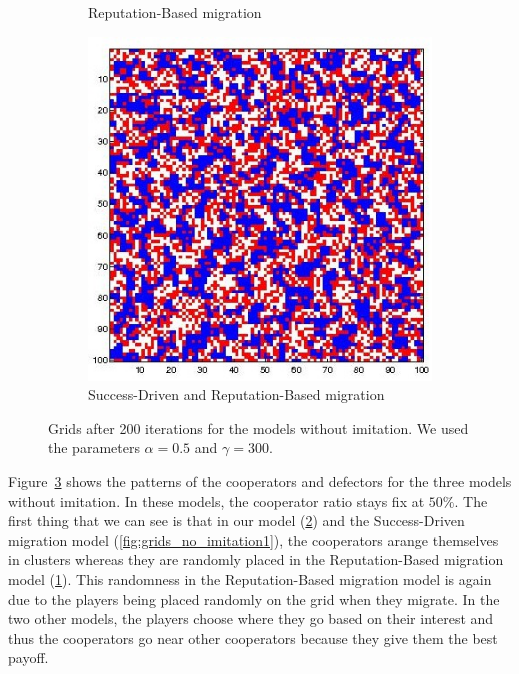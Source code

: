 \documentclass[11pt]{article}
\begin{document}
\begin{figure}[H]
\begin{subfigure}[t]{0.3\textwidth}
	\caption{Reputation-Based migration}
	\label{fig:grids_no_imitation4}
    	\end{subfigure}
	\begin{subfigure}[t]{0.3\textwidth}
        \includegraphics[width=\textwidth]{../../other/grids/m5-t200-a5-g300.jpg}
	\caption{Success-Driven and Reputation-Based migration}
	\label{fig:grids_no_imitation5}
    	\end{subfigure}

	\caption{Grids after 200 iterations for the models without imitation. We used the parameters $\alpha = 0.5$ and $\gamma = 300$.}
	\label{fig:grids_no_imitation}
\end{figure}

Figure~\ref{fig:grids_no_imitation} shows the patterns of the cooperators and defectors for the three models without imitation. In these models, the cooperator ratio stays fix at $50\%$. The first thing that we can see is that in our model (\ref{fig:grids_no_imitation5}) and the Success-Driven migration model (\ref{fig:grids_no_imitation1}), the cooperators arange themselves in clusters whereas they are randomly placed in the Reputation-Based migration model (\ref{fig:grids_no_imitation4}).
This randomness in the Reputation-Based migration model is again due to the players being placed randomly on the grid when they migrate.
In the two other models, the players choose where they go based on their interest and thus the cooperators go near other cooperators because they give them the best payoff.
\end{document}
